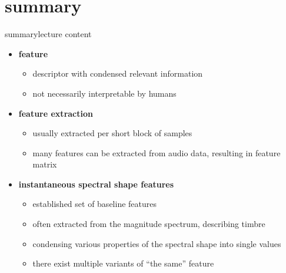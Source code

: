    \section{summary}
        \begin{frame}{summary}{lecture content}
            \vspace{-3mm}
            \begin{itemize}
                \item   \textbf{feature}
                    \begin{itemize}
                        \item   descriptor with condensed relevant information
                        \item   not necessarily interpretable by humans
                    \end{itemize}
                \bigskip
                \item   \textbf{feature extraction}
                    \begin{itemize}
                        \item   usually extracted per short block of samples
                        \item   many features can be extracted from audio data, resulting in feature matrix
                    \end{itemize}
                \bigskip
                \item   \textbf{instantaneous spectral shape features}
                    \begin{itemize}
                        \item   established set of baseline features
                        \item   often extracted from the magnitude spectrum, describing timbre
                        \item   condensing various properties of the spectral shape into single values
                        \item   there exist multiple variants of ``the same'' feature

\end{itemize}
\end{itemize}
\end{frame}
